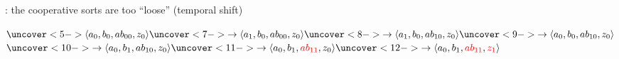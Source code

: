 \begin{frame}[t]
\medskip

: the cooperative sorts are too ``loose'' (temporal shift)

\medskip

$ \uncover<5->{\PHstate{a_0, b_0, ab_{00}, z_0}}
  \uncover<7->{\rightarrow\PHstate{a_1, b_0, ab_{00}, z_0}}
  \uncover<8->{\rightarrow\PHstate{a_1, b_0, ab_{10}, z_0}}
  \uncover<9->{\rightarrow\PHstate{a_0, b_0, ab_{10}, z_0}}$
\\ \qquad
$ \uncover<10->{\rightarrow\PHstate{a_0, b_1, ab_{10}, z_0}}
  \uncover<11->{\rightarrow\PHstate{a_0, b_1, \redex{ab_{11}}, z_0}}
  \uncover<12->{\rightarrow\PHstate{a_0, b_1, \redex{ab_{11}}, \redex{z_1}}}$

\medskip

\end{frame}
